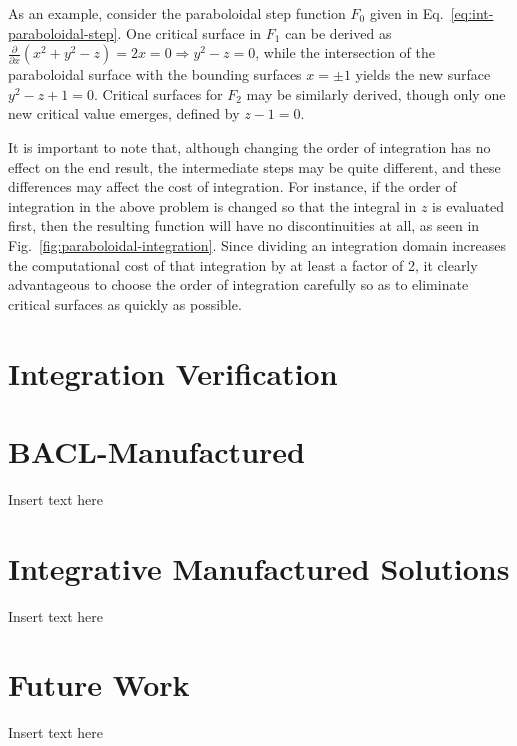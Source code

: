 As an example, consider the paraboloidal step function $F_0$ given in Eq.~\ref{eq:int-paraboloidal-step}. One critical surface in $F_1$ can be derived as 
$\frac{\partial }{{\partial x}}\left( {{x^2} + {y^2} - z} \right) = 2x = 0 \Rightarrow {y^2} - z = 0$, while the intersection of the paraboloidal surface with the bounding surfaces $x=\pm1$ yields the new surface 
${y^2} - z + 1 = 0$.
Critical surfaces for $F_2$ may be similarly derived, though only one new critical value emerges, defined by $z-1=0$. 

It is important to note that, although changing the order of integration has no effect on the end result, the intermediate steps may be quite different, and these differences may affect the cost of integration. For instance, if the order of integration in the above problem is changed so that the integral in $z$ is evaluated first, then the resulting function will have no discontinuities at all, as seen in Fig.~\ref{fig:paraboloidal-integration}. Since dividing an integration domain increases the computational cost of that integration by at least a factor of 2, it clearly advantageous to choose the order of integration carefully so as to eliminate critical surfaces as quickly as possible. 

\section{Integration Verification}
\label{sec:int-verification}

\section{BACL-Manufactured}
\label{sec:int-BACL-Manufactured}

Insert text here

\section{Integrative Manufactured Solutions}
\label{sec:int-IMMS}

Insert text here

\section{Future Work}
\label{sec:int-future}

Insert text here
